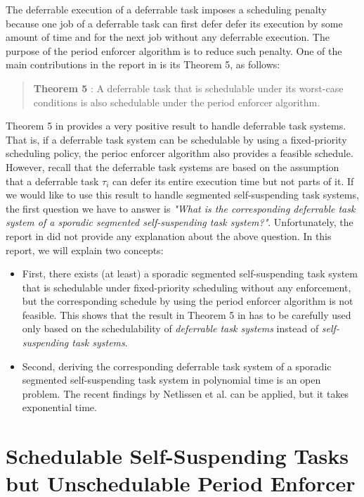 The deferrable execution of a deferrable task imposes a scheduling penalty because one job of a deferrable task can first defer defer its execution by some amount of time and for the next job without any deferrable execution. The purpose of the period enforcer algorithm is to reduce such penalty. One of the main contributions in the report in \cite{Raj:suspension1991} is its Theorem 5, as follows:
\begin{quote}
{\bf Theorem 5} \cite{Raj:suspension1991}: A deferrable task that is schedulable under its worst-case conditions is also schedulable under the period enforcer algorithm.
\end{quote}

Theorem 5 in \cite{Raj:suspension1991} provides a very positive result to handle deferrable task systems. That is, if a deferrable task system can be schedulable by using a fixed-priority scheduling policy, the perioc enforcer algorithm also provides a feasible schedule. However, recall that the deferrable task systems are based on the assumption that a deferrable task $\tau_i$ can defer its entire execution time but not parts of it. If we would like to use this result to handle segmented self-suspending task systems, the first question we have to answer is \emph{"What is the corresponding deferrable task system of a sporadic segmented self-suspending task system?"}. Unfortunately, the report in \cite{Raj:suspension1991} did not provide any explanation about the above question. In this report, we will explain two concepts:
\begin{itemize}
\item First, there exists (at least) a sporadic segmented self-suspending task system that is schedulable under fixed-priority scheduling without any enforcement, but the corresponding schedule by using the period enforcer algorithm is not feasible. This shows that the result in Theorem 5 in \cite{Raj:suspension1991} has to be carefully used only based on the schedulability of \emph{deferrable task systems} instead of \emph{self-suspending task systems}.
\item Second, deriving the corresponding deferrable task system of a sporadic segmented self-suspending task system in polynomial time is an open problem. The recent findings by Netlissen et al. \cite{ecrts15nelissen} can be applied, but it takes exponential time.
\end{itemize}

\section{Schedulable Self-Suspending Tasks but Unschedulable Period Enforcer}
\label{sec:unschedulable}

